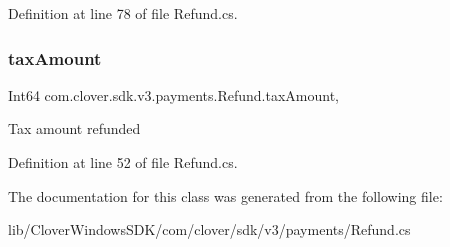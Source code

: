 Definition at line 78 of file Refund.\+cs.

\mbox{\label{classcom_1_1clover_1_1sdk_1_1v3_1_1payments_1_1_refund_a7c8a0b3ac90acd6707b4a6e1bd455488}} 
\subsubsection{\texorpdfstring{tax\+Amount}{taxAmount}}
{\footnotesize\ttfamily Int64 com.\+clover.\+sdk.\+v3.\+payments.\+Refund.\+tax\+Amount\hspace{0.3cm}{\ttfamily [get]}, {\ttfamily [set]}}



Tax amount refunded 



Definition at line 52 of file Refund.\+cs.



The documentation for this class was generated from the following file\+:\begin{DoxyCompactItemize}
\item 
lib/\+Clover\+Windows\+S\+D\+K/com/clover/sdk/v3/payments/Refund.\+cs\end{DoxyCompactItemize}
